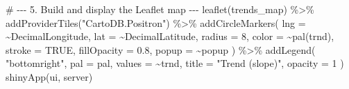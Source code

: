 \documentclass[
  letterpaper,
  DIV=11,
  numbers=noendperiod]{scrreprt}
\newenvironment{Shaded}{\begin{snugshade}}{\end{snugshade}}
\newcommand{\NormalTok}[1]{\textcolor[rgb]{0.00,0.23,0.31}{#1}}
\begin{document}
\begin{Shaded}
\begin{Highlighting}[]
\NormalTok{\# {-}{-}{-} 5. Build and display the Leaflet map {-}{-}{-}}
\NormalTok{leaflet(trends\_map) \%\textgreater{}\%}
\NormalTok{  addProviderTiles("CartoDB.Positron") \%\textgreater{}\%}
\NormalTok{  addCircleMarkers(}
\NormalTok{    lng = \textasciitilde{}DecimalLongitude,}
\NormalTok{    lat = \textasciitilde{}DecimalLatitude,}
\NormalTok{    radius = 8,}
\NormalTok{    color = \textasciitilde{}pal(trnd),}
\NormalTok{    stroke = TRUE,}
\NormalTok{    fillOpacity = 0.8,}
\NormalTok{    popup = \textasciitilde{}popup}
\NormalTok{  ) \%\textgreater{}\%}
\NormalTok{  addLegend(}
\NormalTok{    "bottomright",}
\NormalTok{    pal = pal,}
\NormalTok{    values = \textasciitilde{}trnd,}
\NormalTok{    title = "Trend (slope)",}
\NormalTok{    opacity = 1}
\NormalTok{  )}
\NormalTok{shinyApp(ui, server)}
\end{Highlighting}
\end{Shaded}
\end{document}
